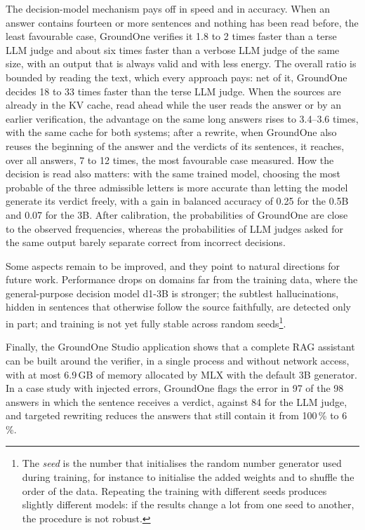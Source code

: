 The decision-model mechanism pays off in speed and in accuracy. When an answer contains fourteen or more sentences and nothing has been read before, the least favourable case, GroundOne verifies it 1.8 to 2 times faster than a terse LLM judge and about six times faster than a verbose LLM judge of the same size, with an
output that is always valid and with less energy. The overall ratio is bounded by reading the text, which every approach pays: net of it, GroundOne decides 18 to 33 times faster than the terse LLM judge. When the sources are already in the KV cache, read ahead while the user reads the answer or by an earlier verification, the advantage on the same long answers rises to 3.4--3.6 times, with the same cache for both systems; after a rewrite, when GroundOne also reuses the beginning of the answer and the verdicts of its sentences, it reaches, over all answers, 7 to 12 times, the most favourable case measured. How the decision is read also matters: with the same trained model,
choosing the most probable of the three admissible letters is more accurate than letting the model generate its verdict
freely, with a gain in balanced accuracy of 0.25 for the 0.5B and 0.07 for the 3B. After calibration, the probabilities of GroundOne are
close to the observed frequencies, whereas the probabilities of LLM judges asked for the same output barely
separate correct from incorrect decisions.

Some aspects remain to be improved, and they point to natural directions for future work. Performance drops on domains
far from the training data, where the general-purpose decision model d1-3B is stronger; the subtlest hallucinations, hidden in
sentences that otherwise follow the source faithfully, are detected only in part; and training is not yet fully stable
across random seeds\footnote{The \emph{seed} is the number that initialises the random number generator used during
training, for instance to initialise the added weights and to shuffle the order of the data. Repeating the training with
different seeds produces slightly different models: if the results change a lot from one seed to another, the procedure
is not robust.}.

Finally, the GroundOne Studio application shows that a complete RAG assistant can be built around the verifier, in a
single process and without network access, with at most 6.9\,GB of memory allocated by MLX with the default 3B generator. In a case study with
injected errors, GroundOne flags the error in 97 of the 98 answers in which the sentence receives a verdict, against 84
for the LLM judge, and targeted rewriting reduces the answers that still contain it from 100\,\% to 6\,\%.

